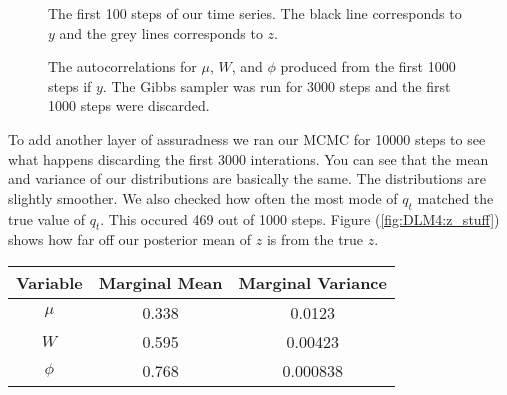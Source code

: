 \documentclass{article}
\begin{document}
\begin{figure}[!h]
\begin{center}
\end{center}
\caption{The first 100 steps of our time series.  The black line corresponds to $y$ and the grey lines corresponds to $z$.}
\end{figure}

\begin{center}
\end{center}

\begin{figure}[!h]
\begin{center}
\end{center}
\caption{The autocorrelations for $\mu$, $W$, and $\phi$ produced from the first 1000 steps if $y$.  The Gibbs sampler was run for 3000 steps and the first 1000 steps were discarded.}
\end{figure}

To add another layer of assuradness we ran our MCMC for 10000 steps to see what happens discarding the first 3000 interations.  You can see that the mean and variance of our distributions are basically the same.  The distributions are slightly smoother.  We also checked how often the most mode of $q_t$ matched the true value of $q_t$.  This occured 469 out of 1000 steps.  Figure (\ref{fig:DLM4:z_stuff}) shows how far off our posterior mean of $z$ is from the true $z$.

\begin{center}
\begin{tabular}{c | c | c}
Variable & Marginal Mean & Marginal Variance \\
\hline
$\mu$ & 0.338 & 0.0123 \\
$W$ & 0.595 & 0.00423 \\
$\phi$ & 0.768 & 0.000838 \\
\end{tabular}
\end{center}
\end{document}
